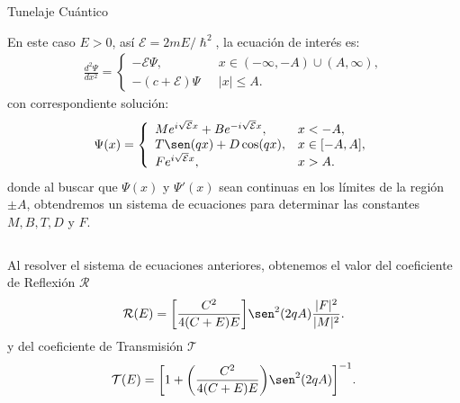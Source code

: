 \documentclass[aspectratio=1610]{beamer}
\begin{document}
\begin{frame}{Tunelaje Cuántico}
   
En este caso $E > 0$, así $\mathcal{E} = 2mE/\hslash^2$, la ecuación de interés es:
\begin{align}
        \frac{d^2\Psi}{dx^2}= 
        \left\{ \begin{array}{ll}
        -\mathcal{E}\Psi,& \:\:\:  x \in (-\infty,-A)\cup (A,\infty),
        \\
        -(c+\mathcal{E})\Psi& \:\:\: |x| \leq A.
        \end{array}
        \right.
        \label{eq:SCsimple}
\end{align}
con correspondiente solución:
\begin{align}
        \Psi(x) = 
        \left\{ \begin{array}{ll}
        Me^{i\sqrt{\mathcal{E}}x}+Be^{-i\sqrt{\mathcal{E}}x}, & x<-A,
        \\
        T\sen(qx) + D\cos(qx), & x \in [-A,A],
        \\ Fe^{i\sqrt{\mathcal{E}}x},& x > A.
        \end{array}
        \right.
        \label{eq:Tunelaje}
\end{align}
donde al buscar que $\Psi(x)$ y $\Psi'(x)$ sean continuas en los límites de la región $\pm A$, obtendremos un sistema de ecuaciones para determinar las constantes $M, B, T, D$ y $F$. 

    
\begin{columns}
\column{37em}
\end{columns}
\end{frame}
\begin{frame}{}
   
Al resolver el sistema de ecuaciones anteriores, obtenemos el valor del coeficiente de Reflexión $\mathcal{R}$
\begin{align*}
    \mathcal{R}(E) = \bigg[\frac{C^2}{4(C+E)E}\bigg]\sen^2(2qA)\frac{|F|^2}{|M|^2}.
\end{align*}
y del coeficiente de Transmisión $\mathcal{T}$
\begin{align*}
    \mathcal{T}(E) = 
    \bigg[1+\bigg(\frac{C^2}{4(C+E)E}\bigg)\sen^2(2qA)\bigg] ^{-1}.
\end{align*}

    
\begin{columns}
\column{37em}
\end{columns}
\end{frame}
\end{document}
